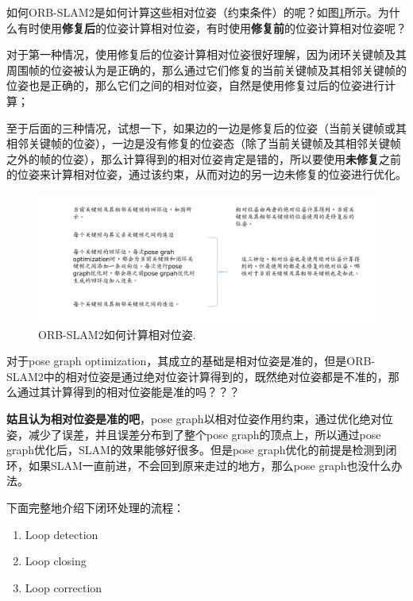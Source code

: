 如何ORB-SLAM2是如何计算这些相对位姿（约束条件）的呢？如图\ref{fig:loop_constraint}所示。为什么有时使用\textbf{修复后}的位姿计算相对位姿，有时使用\textbf{修复前}的位姿计算相对位姿呢？

对于第一种情况，使用修复后的位姿计算相对位姿很好理解，因为闭环关键帧及其周围帧的位姿被认为是正确的，那么通过它们修复的当前关键帧及其相邻关键帧的位姿也是正确的，那么它们之间的相对位姿，自然是使用修复过后的位姿进行计算；

至于后面的三种情况，试想一下，如果边的一边是修复后的位姿（当前关键帧或其相邻关键帧的位姿），一边是没有修复的位姿态（除了当前关键帧及其相邻关键帧之外的帧的位姿），那么计算得到的相对位姿肯定是错的，所以要使用\textbf{未修复}之前的位姿来计算相对位姿，通过该约束，从而对边的另一边未修复的位姿进行优化。

\begin{figure}[h]%
	\centering  %
	\includegraphics[width=1.0\linewidth]{image/ORB-SLAM/LoopConstraint.png}  %
	\caption{ORB-SLAM2如何计算相对位姿.}  %
	\label{fig:loop_constraint}   %
\end{figure}


\begin{note}
	对于pose graph optimization，其成立的基础是相对位姿是准的，但是ORB-SLAM2中的相对位姿是通过绝对位姿计算得到的，既然绝对位姿都是不准的，那么通过其计算得到的相对位姿能是准的吗？？？
\end{note}


\textbf{姑且认为相对位姿是准的吧}，pose graph以相对位姿作用约束，通过优化绝对位姿，减少了误差，并且误差分布到了整个pose graph的顶点上，所以通过pose graph优化后，SLAM的效果能够好很多。但是pose graph优化的前提是检测到闭环，如果SLAM一直前进，不会回到原来走过的地方，那么pose graph也没什么办法。



下面完整地介绍下闭环处理的流程：
\begin{enumerate}
	\item Loop detection
	\item Loop closing
	\item Loop correction
\end{enumerate}

